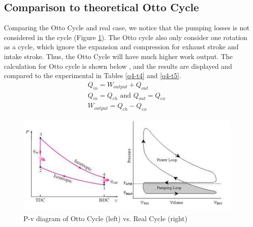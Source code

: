 \documentclass[11pt]{article}
\begin{document}
\subsection*{Comparison to theoretical Otto Cycle}
Comparing the Otto Cycle and real case, we notice that the pumping losses is not considered in the cycle (Figure \ref{q4-f5}). The Otto cycle also only consider one rotation as a cycle, which ignore the expansion and compression for exhaust stroke and intake stroke. Thus, the Otto Cycle will have much higher work output. The calculation for Otto cycle is shown below \cite{q4-r4}, and the results are displayed and compared to the experimental in Tables \ref{q4-t4} and \ref{q4-t5}.
\begin{eqnarray}
Q_{in} = W_{output} + Q_{out}\\
Q_{in} = Q_{ch} \textrm{ and } Q_{out} = Q_{ex}\\
W_{output} = Q_{ch} - Q_{ex}
\end{eqnarray}
\begin{figure}[H]
	\centering
    \includegraphics[height = 5cm]{./img/diagram20.png}
    \caption{P-v diagram of Otto Cycle (left) vs. Real Cycle (right)}
    \label{q4-f5}
\end{figure}
\end{document}
